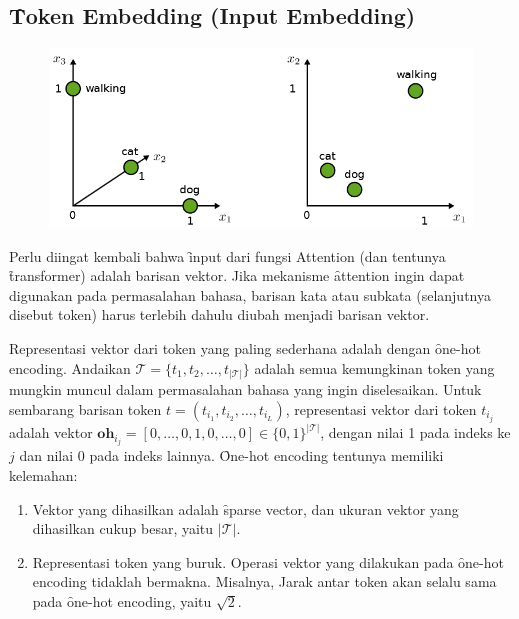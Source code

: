 	\subsection{\f{Token Embedding (Input Embedding)}}
	\label{sec:token-embedding}
	\begin{figure}
		\centering
		\includegraphics[width=1\textwidth]{assets/pics/token-embedding.png}
		\label{fig:token-embedding}
	\end{figure}
	Perlu diingat kembali bahwa \f{input} dari fungsi Attention (dan tentunya \f{transformer}) adalah barisan vektor. Jika mekanisme \f{attention} ingin dapat digunakan pada permasalahan bahasa, barisan kata atau subkata (selanjutnya disebut token) harus terlebih dahulu diubah menjadi barisan vektor.

	Representasi vektor dari token yang paling sederhana adalah dengan \f{one-hot encoding}. Andaikan $\mathcal{T} = \{t_1, t_2, \dots, t_{|\mathcal{T}|}\}$ adalah semua kemungkinan token yang mungkin muncul dalam permasalahan bahasa yang ingin diselesaikan. Untuk sembarang barisan token $t = (t_{i_1}, t_{i_2}, \dots, t_{i_L})$, representasi vektor dari token $t_{i_j}$ adalah vektor $\mathbf{oh}_{i_j} = [0, \dots, 0, 1, 0, \dots, 0] \in\{0,1\}^{|\mathcal{T}|}$, dengan nilai 1 pada indeks ke $j$ dan nilai 0 pada indeks lainnya. \f{One-hot encoding} tentunya memiliki kelemahan:
	\begin{enumerate}
		\item Vektor yang dihasilkan adalah \f{sparse vector}, dan ukuran vektor yang dihasilkan cukup besar, yaitu $|\mathcal{T}|$.
		\item Representasi token yang buruk. Operasi vektor yang dilakukan pada \f{one-hot encoding} tidaklah bermakna. Misalnya, Jarak antar token akan selalu sama pada \f{one-hot encoding}, yaitu $\sqrt{2}$.
	\end{enumerate}

